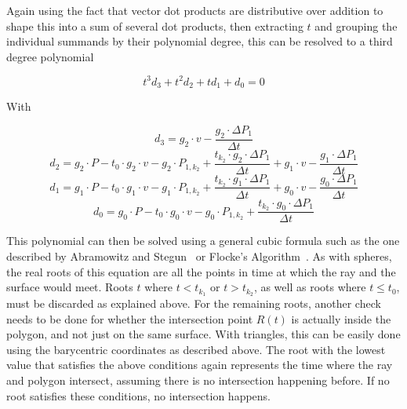 Again using the fact that vector dot products are distributive over addition to shape this into a sum of several dot products,
then extracting \(t\) and grouping the individual summands by their polynomial degree,
this can be resolved to a third degree polynomial

\begin{equation}\label{SurfacePolyStart}
    t^3d_3 + t^2d_2 + td_1 + d_0 = 0
\end{equation}

With

\begin{equation}
    d_3 = g_2 \cdot v
    - \frac{g_2 \cdot \Delta P_1}{\Delta t}
\end{equation}
\begin{equation}
    d_2 = g_2 \cdot P
    - t_0 \cdot g_2 \cdot v
    - g_2 \cdot P_{1, k_2}
    + \frac{t_{k_2} \cdot g_2 \cdot \Delta P_1}{\Delta t}
    + g_1 \cdot v
    - \frac{g_1 \cdot \Delta P_1}{\Delta t}
\end{equation}
\begin{equation}
    d_1 = g_1 \cdot P
    - t_0 \cdot g_1 \cdot v
    - g_1 \cdot P_{1, k_2}
    + \frac{t_{k_2} \cdot g_1 \cdot \Delta P_1}{\Delta t}
    + g_0 \cdot v
    - \frac{g_0 \cdot \Delta P_1}{\Delta t}
\end{equation}
\begin{equation}\label{SurfacePolyEnd}
    d_0 = g_0 \cdot P
    - t_0 \cdot g_0 \cdot v
    - g_0 \cdot P_{1, k_2}
    + \frac{t_{k_2} \cdot g_0 \cdot \Delta P_1}{\Delta t}
\end{equation}

This polynomial can then be solved using a general cubic formula such as the one described by Abramowitz and Stegun~\cite{AS48}
or Flocke's Algorithm~\cite{Fl15}.
\newline
As with spheres, the real roots of this equation are all the points in time at which the ray and the surface would meet.
Roots \(t\) where \(t < t_{k_1}\) or \(t > t_{k_2}\), as well as roots where \(t \le t_0\),
must be discarded as explained above.
\newline
For the remaining roots, another check needs to be done
for whether the intersection point \(R(t)\) is actually inside the polygon, and not just on the same surface.
With triangles, this can be easily done using the barycentric coordinates as described above.
\newline
The root with the lowest value that satisfies the above conditions again represents the time where the ray and polygon intersect,
assuming there is no intersection happening before. If no root satisfies these conditions, no intersection happens.

